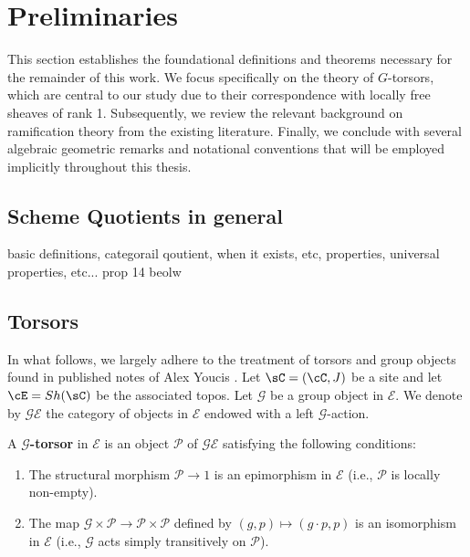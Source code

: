 \section{Preliminaries}
This section establishes the foundational definitions and theorems necessary for the remainder of this work. 
We focus specifically on the theory of $G$-torsors, which are central to our study due to their correspondence with 
locally free sheaves of rank 1. 
Subsequently, we review the relevant background on ramification theory from the existing literature. 
Finally, we conclude with several algebraic geometric remarks and notational conventions that will be employed 
implicitly throughout this thesis.

\subsection{Scheme Quotients in general}
basic definitions, categorail qoutient, when it exists, etc, properties, universal properties, etc...
prop 14 beolw
\subsection{Torsors}

In what follows, we largely adhere to the treatment of torsors and group objects found in published notes of Alex Youcis \cite{YoucisTorsors}.
Let $\sC=(\cC, J)$ be a site and let $\cE=Sh(\sC)$ be the associated topos. 
Let $\mathcal{G}$ be a group object in $\mathcal{E}$. 
We denote by $\mathcal{G}\mathcal{E}$ the category of objects in $\mathcal{E}$ endowed with a left $\mathcal{G}$-action. 

\begin{definition}
    A \textbf{$\mathcal{G}$-torsor} in $\mathcal{E}$ is an object $\mathcal{P}$ of $\mathcal{G}\mathcal{E}$ satisfying the following conditions:
    \begin{enumerate}
        \item The structural morphism $\mathcal{P} \to 1$ is an epimorphism in $\mathcal{E}$ (i.e., $\mathcal{P}$ is locally non-empty).
        \item The map $\mathcal{G} \times \mathcal{P} \to \mathcal{P} \times \mathcal{P}$ defined by $(g, p) \mapsto (g \cdot p, p)$ is an isomorphism in $\mathcal{E}$ (i.e., $\mathcal{G}$ acts simply transitively on $\mathcal{P}$).
    \end{enumerate}
\end{definition}

